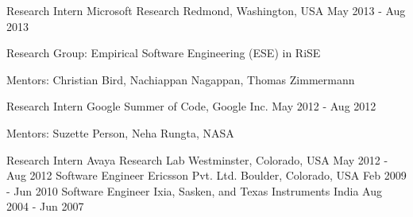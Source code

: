 \newpage
{}
\begin{cventries}
  \cventry
    {Research Intern}
    {Microsoft Research }
    {Redmond, Washington, USA}
    {May 2013 - Aug 2013}
    {
      \begin{cvitems}
        \item {Research Group: Empirical Software Engineering (ESE) in RiSE}
        \item {Mentors: Christian Bird, Nachiappan Nagappan, Thomas Zimmermann}
      \end{cvitems}
    }
     \vspace{-4mm}
  \cventry
    {Research Intern}
    {Google Summer of Code, Google Inc.}
    {}
    {May 2012 - Aug 2012}
    {
    \begin{cvitems}
        \item {Mentors: Suzette Person, Neha Rungta, NASA}
      \end{cvitems} 
    }
     \vspace{-4mm}
     \cventry
    {Research Intern}
    {Avaya Research Lab}
    {Westminster, Colorado, USA}
    {May 2012 - Aug 2012}
    {
    }
     \vspace{-6mm}
      \cventry
    {Software Engineer}
    {Ericsson Pvt. Ltd.}
    {Boulder, Colorado, USA}
    {Feb 2009 - Jun 2010}
    {
    }
     \vspace{-6mm}
    \cventry
    {Software Engineer}
    {Ixia, Sasken, and Texas Instruments}
    {India}
    {Aug 2004 - Jun 2007}
    {
    }
     \vspace{-6mm}
\end{cventries}